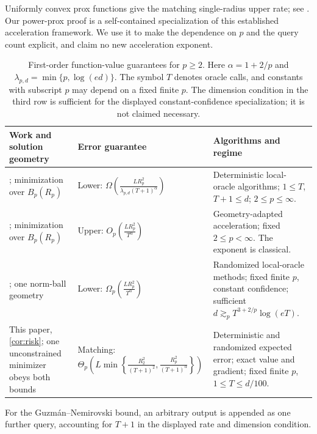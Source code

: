 \documentclass[11pt]{article}
\theoremstyle{definition}
\theoremstyle{remark}
\begin{document}
Uniformly convex prox functions give the matching single-radius
upper rate; see \citet{dAspremontGuzmanJaggi2018}.
Our power-prox proof is a self-contained specialization of this
established acceleration framework. We use it to make the
dependence on $p$ and the query count explicit, and claim no new
acceleration exponent.

\begin{table}[htbp]
\centering
\caption{First-order function-value guarantees for $p\ge2$.
Here $\alpha=1+2/p$ and $\lambda_{p,d}=\min\{p,\log(ed)\}$.
The symbol $T$ denotes oracle calls, and constants with subscript $p$
may depend on a fixed finite $p$.
The dimension condition in the third row is sufficient for the displayed
constant-confidence specialization; it is not claimed necessary.}
\label{tab:related-comparison}
\small
\renewcommand{\arraystretch}{1.15}
\begin{tabularx}{\textwidth}{@{}>{\raggedright\arraybackslash}p{}>{\raggedright\arraybackslash}p{}Y@{}}
\toprule
Work and solution geometry & Error guarantee & Algorithms and regime \\
\midrule
\citet{GuzmanNemirovski2015}; minimization over $B_p(R_p)$
& Lower: $\displaystyle\Omega\!\left(\frac{LR_p^2}{\lambda_{p,d}(T+1)^\alpha}\right)$
& Deterministic local-oracle algorithms; $1\le T$, $T+1\le d$; $2\le p\le\infty$. \\
\addlinespace[5pt]
\citet{dAspremontGuzmanJaggi2018}; minimization over $B_p(R_p)$
& Upper: $\displaystyle O_p\!\left(\frac{LR_p^2}{T^\alpha}\right)$
& Geometry-adapted acceleration; fixed $2\le p<\infty$. The exponent is classical. \\
\addlinespace[5pt]
\citet[Theorem~14]{DiakonikolasGuzman2020}; one norm-ball geometry
& Lower: $\displaystyle\Omega_p\!\left(\frac{LR_p^2}{T^\alpha}\right)$
& Randomized local-oracle methods; fixed finite $p$, constant confidence; sufficient $d\gtrsim_p T^{3+2/p}\log(eT)$. \\
\addlinespace[5pt]
This paper, \cref{cor:risk}; one unconstrained minimizer obeys both bounds
& Matching: $\displaystyle\Theta_p\!\left(L\min\left\{\frac{R_2^2}{(T+1)^2},\frac{R_p^2}{(T+1)^\alpha}\right\}\right)$
& Deterministic and randomized expected error; exact value and gradient; fixed finite $p$, $1\le T\le d/100$. \\
\bottomrule
\end{tabularx}
\end{table}

For the Guzm\'an--Nemirovski bound, an arbitrary output is appended as
one further query, accounting for $T+1$ in the displayed rate and
dimension condition.
\end{document}
